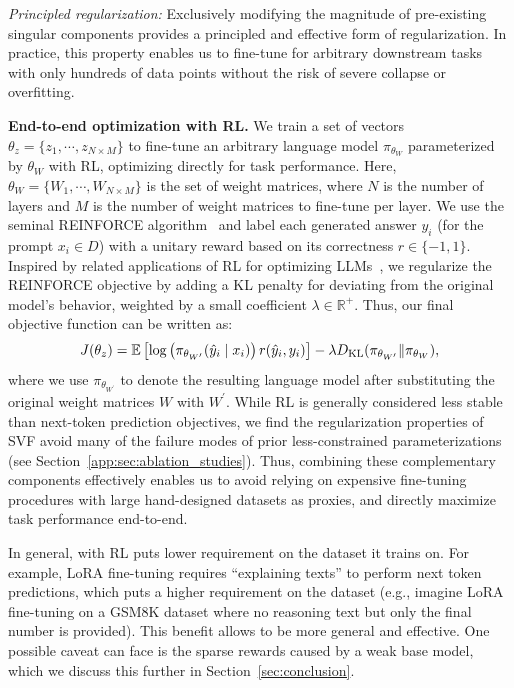 \textit{Principled regularization:} Exclusively modifying the magnitude of pre-existing singular components provides a principled and effective form of regularization.
In practice, this property enables us to fine-tune for arbitrary downstream tasks with only hundreds of data points without the risk of severe collapse or overfitting.

\textbf{End-to-end optimization with RL.} We train a set of \svdacro vectors $\theta_z = \{z_1, \cdots, z_{N \times M}\}$ to fine-tune an arbitrary language model $\pi_{\theta_W}$ parameterized by $\theta_{W}$ with RL, optimizing directly for task performance.
Here, $\theta_{W}=\{ W_1, \cdots, W_{N \times M} \}$ is the set of weight matrices, where $N$ is the number of layers and $M$ is the number of weight matrices to fine-tune per layer.
We use the seminal REINFORCE algorithm~\citep{williams1992simple} and label each generated answer $y_i$ (for the prompt $x_i\in D$) with a unitary reward based on its correctness $r\in \{-1, 1\}$.
Inspired by related applications of RL for optimizing LLMs~\citep{ouyang2022training}, we regularize the REINFORCE objective by adding a KL penalty for deviating from the original model's behavior, weighted by a small coefficient $\lambda \in \mathbb{R^+}$. Thus, our final objective function can be written as:
\begin{equation}
    J(\theta_z) = \mathbb{E} \left[\log\left(\pi_{\theta_{W^\prime}}(\hat{y}_i \mid x_i)\right)r(\hat{y}_i, y_i)\right] - \lambda D_\mathrm{KL}(\pi_{\theta_{W^\prime}} \| \pi_{\theta_{W}}),
\label{eqn:sec3:reinforce}
\end{equation}
where we use $\pi_{\theta_{W^\prime}}$ to denote the resulting language model after substituting the original weight matrices $W$ with $W^\prime$.
While RL is generally considered less stable than next-token prediction objectives, we find the regularization properties of SVF avoid many of the failure modes of prior less-constrained parameterizations (see Section~\ref{app:sec:ablation_studies}).
Thus, combining these complementary components effectively enables us to avoid relying on expensive fine-tuning procedures with large hand-designed datasets as proxies, and directly maximize task performance end-to-end.

In general, \svdacro with RL puts lower requirement on the dataset it trains on.
For example, LoRA fine-tuning requires ``explaining texts'' to perform next token predictions, which puts a higher requirement on the dataset (e.g., imagine LoRA fine-tuning on a GSM8K dataset where no reasoning text but only the final number is provided).
This benefit allows \svdacro to be more general and effective.
One possible caveat \svdacro can face is the sparse rewards caused by a weak base model, which we discuss this further in Section~\ref{sec:conclusion}.

